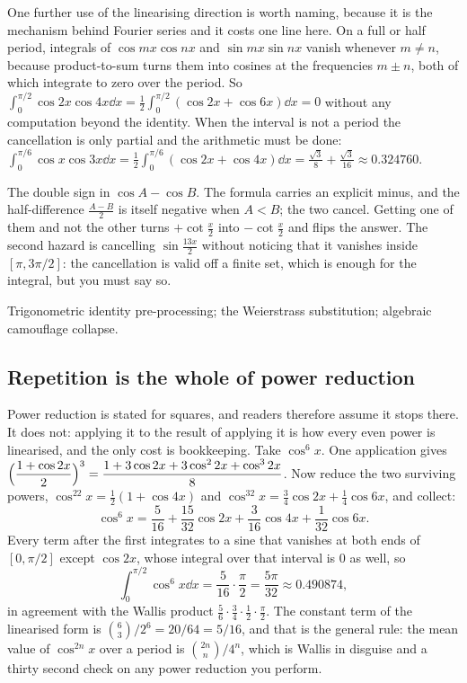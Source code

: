 One further use of the linearising direction is worth naming, because it is the mechanism behind Fourier series and it costs one line here. On a full or half period, integrals of $\cos mx\cos nx$ and $\sin mx\sin nx$ vanish whenever $m\neq n$, because product-to-sum turns them into cosines at the frequencies $m\pm n$, both of which integrate to zero over the period. So $\int_0^{\pi/2}\cos2x\cos4x\dd x=\tfrac12\int_0^{\pi/2}(\cos2x+\cos6x)\dd x=0$ without any computation beyond the identity. When the interval is not a period the cancellation is only partial and the arithmetic must be done: $\int_0^{\pi/6}\cos x\cos3x\dd x=\tfrac12\int_0^{\pi/6}(\cos2x+\cos4x)\dd x=\tfrac{\sqrt3}{8}+\tfrac{\sqrt3}{16}\approx0.324760$.

\begin{trap}
The double sign in $\cos A-\cos B$. The formula carries an explicit minus, and the half-difference $\tfrac{A-B}{2}$ is itself negative when $A<B$; the two cancel. Getting one of them and not the other turns $+\cot\tfrac x2$ into $-\cot\tfrac x2$ and flips the answer. The second hazard is cancelling $\sin\tfrac{13x}{2}$ without noticing that it vanishes inside $[\pi,3\pi/2]$: the cancellation is valid off a finite set, which is enough for the integral, but you must say so.
\end{trap}

\begin{seealsob}Trigonometric identity pre-processing; the Weierstrass substitution; algebraic camouflage collapse.\end{seealsob}

\subsection{Repetition is the whole of power reduction}

Power reduction is stated for squares, and readers therefore assume it stops there. It does not: applying it to the result of applying it is how every even power is linearised, and the only cost is bookkeeping. Take $\cos^6x$. One application gives $\Bigl(\dfrac{1+\cos2x}{2}\Bigr)^3=\dfrac{1+3\cos2x+3\cos^22x+\cos^32x}{8}$. Now reduce the two surviving powers, $\cos^22x=\tfrac12(1+\cos4x)$ and $\cos^32x=\tfrac34\cos2x+\tfrac14\cos6x$, and collect:
\[
\cos^6x=\frac{5}{16}+\frac{15}{32}\cos2x+\frac{3}{16}\cos4x+\frac{1}{32}\cos6x .
\]
Every term after the first integrates to a sine that vanishes at both ends of $[0,\pi/2]$ except $\cos2x$, whose integral over that interval is $0$ as well, so
\[
\int_0^{\pi/2}\cos^6x\dd x=\frac{5}{16}\cdot\frac{\pi}{2}=\frac{5\pi}{32}\approx0.490874 ,
\]
in agreement with the Wallis product $\tfrac56\cdot\tfrac34\cdot\tfrac12\cdot\tfrac{\pi}{2}$. The constant term of the linearised form is $\binom{6}{3}/2^6=20/64=5/16$, and that is the general rule: the mean value of $\cos^{2n}x$ over a period is $\binom{2n}{n}/4^{n}$, which is Wallis in disguise and a thirty second check on any power reduction you perform.

